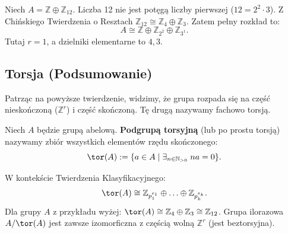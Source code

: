 \begin{eg}
    Niech $A = \mathbb{Z} \oplus \mathbb{Z}_{12}$.
    Liczba 12 nie jest potęgą liczby pierwszej ($12 = 2^2 \cdot 3$). Z Chińskiego Twierdzenia o Resztach $\mathbb{Z}_{12} \cong \mathbb{Z}_4 \oplus \mathbb{Z}_3$.
    Zatem pełny rozkład to:
    \[ A \cong \mathbb{Z} \oplus \mathbb{Z}_{2^2} \oplus \mathbb{Z}_{3^1}. \]
    Tutaj $r=1$, a dzielniki elementarne to $4, 3$.
\end{eg}

\subsection{Torsja (Podsumowanie)}

Patrząc na powyższe twierdzenie, widzimy, że grupa rozpada się na część nieskończoną ($\mathbb{Z}^r$) i część skończoną. Tę drugą nazywamy fachowo torsją.

\begin{definition}[Torsja]
    Niech $A$ będzie grupą abelową.
    \textbf{Podgrupą torsyjną} (lub po prostu torsją) nazywamy zbiór wszystkich elementów rzędu skończonego:
    \[
        \tor(A) := \{ a \in A \mid \exists_{n \in \mathbb{N}_{>0}} \; na = 0 \}.
    \]
\end{definition}

\begin{remark}
    W kontekście Twierdzenia Klasyfikacyjnego:
    \[ \tor(A) \cong \mathbb{Z}_{p_1^{e_1}} \oplus \ldots \oplus \mathbb{Z}_{p_k^{e_k}}. \]
    Dla grupy $A$ z przykładu wyżej: $\tor(A) \cong \mathbb{Z}_4 \oplus \mathbb{Z}_3 \cong \mathbb{Z}_{12}$.
    Grupa ilorazowa $A/\tor(A)$ jest zawsze izomorficzna z częścią wolną $\mathbb{Z}^r$ (jest beztorsyjna).
\end{remark}
